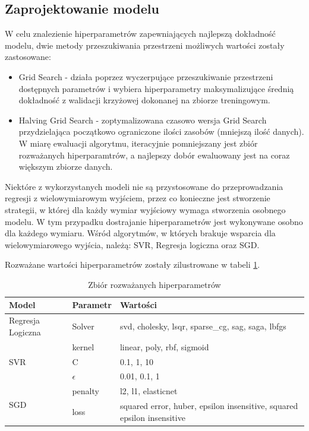 \subsection{Zaprojektowanie modelu}

W celu znalezienie hiperparametrów zapewniających najlepszą dokładność modelu,
dwie metody przeszukiwania przestrzeni możliwych wartości zostały zastosowane:

\begin{itemize}
    \item Grid Search - działa poprzez wyczerpujące przeszukiwanie 
    przestrzeni dostępnych parametrów i wybiera hiperparametry maksymalizujące
    średnią dokładność z walidacji krzyżowej dokonanej na zbiorze treningowym.
    \item Halving Grid Search - zoptymalizowana czasowo wersja Grid Search
    przydzielająca początkowo ograniczone ilości zasobów (mniejszą ilość
    danych). W miarę ewaluacji algorytmu, iteracyjnie pomniejszany jest zbiór
    rozważanych hiperparamtrów, a najlepszy dobór ewaluowany jest na coraz większym
    zbiorze danych.
\end{itemize}

Niektóre z wykorzystanych modeli nie są przystosowane do przeprowadzania 
regresji z wielowymiarowym wyjściem, przez co konieczne jest stworzenie strategii,
w której dla każdy wymiar wyjściowy wymaga stworzenia osobnego modelu. W tym przypadku
dostrajanie hiperparametrów jest wykonywane osobno dla każdego wymiaru. Wśród
algorytmów, w których brakuje wsparcia dla wielowymiarowego wyjścia, należą: 
SVR, Regresja logiczna oraz SGD.

Rozważane wartości hiperparametrów zostały zilustrowane w tabeli \ref{hiperparametry}.

\begin{table}[H]
    \centering
    \caption{Zbiór rozważanych hiperparametrów} \label{hiperparametry}
    \bigskip
    \begin{tabular}{|p{4cm}|p{4cm}|p{4cm}|}
    \hline
    Model & Parametr & Wartości \\
    \hline
    Regresja Logiczna & Solver & svd, cholesky, lsqr, sparse\_cg, sag, saga, lbfgs \\
    \hline
    \multirow{3}{*}{SVR} & kernel & linear, poly, rbf, sigmoid\\
    \cline{2-3}
     & C & 0.1, 1, 10\\
    \cline{2-3}
        & $\epsilon$ & 0.01, 0.1, 1\\
    \hline
    \multirow{3}{*}{SGD} & penalty & l2, l1, elasticnet\\
    \cline{2-3}
     & loss & squared error, huber, epsilon insensitive, squared epsilon insensitive\\
    \hline
\end{tabular}
\end{table}

